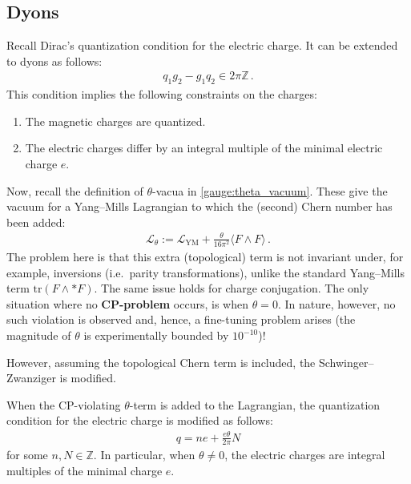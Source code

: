 \subsection{Dyons}


    \begin{property}
        Recall Dirac's quantization condition for the electric charge.  It can be extended to dyons as follows:
        \begin{gather}
            q_1g_2-g_1q_2 \in 2\pi\mathbb{Z}\,.
        \end{gather}
        This condition implies the following constraints on the charges:
        \begin{enumerate}
            \item The magnetic charges are quantized.
            \item The electric charges differ by an integral multiple of the minimal electric charge $e$.
        \end{enumerate}
    \end{property}


    Now, recall the definition of $\theta$-vacua in \cref{gauge:theta_vacuum}. These give the vacuum for a Yang--Mills Lagrangian to which the (second) Chern number has been added:
    \begin{gather}
        \mathcal{L}_\theta := \mathcal{L}_{\text{YM}} + \frac{\theta}{16\pi^2}\langle F\wedge F\rangle\,.
    \end{gather}
    The problem here is that this extra (topological) term is not invariant under, for example, inversions (i.e.~parity transformations), unlike the standard Yang--Mills term $\mathrm{tr}(F\wedge\ast F)$. The same issue holds for charge conjugation. The only situation where no \textbf{CP-problem} occurs, is when $\theta=0$. In nature, however, no such violation is observed and, hence, a fine-tuning problem arises (the magnitude of $\theta$ is experimentally bounded by $10^{-10}$)!

    However, assuming the topological Chern term is included, the Schwinger--Zwanziger is modified.
    \begin{property}
        When the CP-violating $\theta$-term is added to the Lagrangian, the quantization condition for the electric charge is modified as follows:
        \begin{gather}
            q = ne + \frac{e\theta}{2\pi}N
        \end{gather}
        for some $n,N\in\mathbb{Z}$. In particular, when $\theta\neq0$, the electric charges are integral multiples of the minimal charge $e$.
    \end{property}

